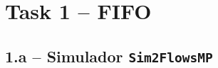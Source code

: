\documentclass[11pt,a4paper]{article}
\newcommand{\code}[1]{\texttt{#1}}
\begin{document}






\section{Task 1 -- FIFO}

\subsection{1.a -- Simulador \code{Sim2FlowsMP}}
\end{document}
